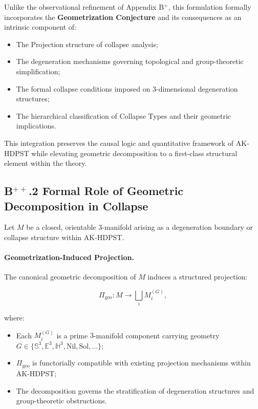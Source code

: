\documentclass[11pt]{article}
\begin{document}
Unlike the observational refinement of Appendix B$^{+}$, this formulation formally incorporates the \textbf{Geometrization Conjecture} and its consequences as an intrinsic component of:

\begin{itemize}
    \item The Projection structure of collapse analysis;
    \item The degeneration mechanisms governing topological and group-theoretic simplification;
    \item The formal collapse conditions imposed on $3$-dimensional degeneration structures;
    \item The hierarchical classification of Collapse Types and their geometric implications.
\end{itemize}

This integration preserves the causal logic and quantitative framework of AK-HDPST while elevating geometric decomposition to a first-class structural element within the theory.

\subsection*{B$^{++}$.2 Formal Role of Geometric Decomposition in Collapse}

Let $M$ be a closed, orientable $3$-manifold arising as a degeneration boundary or collapse structure within AK-HDPST.

\paragraph{Geometrization-Induced Projection.}  
The canonical geometric decomposition of $M$ induces a structured projection:

\[
\Pi_{\mathrm{geo}} : M \longrightarrow \bigsqcup_i M_i^{(G)},
\]

where:

\begin{itemize}
    \item Each $M_i^{(G)}$ is a prime $3$-manifold component carrying geometry $G \in \{ \mathbb{S}^3, \mathbb{E}^3, \mathbb{H}^3, \mathrm{Nil}, \mathrm{Sol}, \ldots \}$;
    \item $\Pi_{\mathrm{geo}}$ is functorially compatible with existing projection mechanisms within AK-HDPST;
    \item The decomposition governs the stratification of degeneration structures and group-theoretic obstructions.
\end{itemize}
\end{document}
